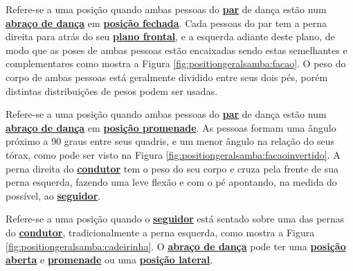 \begin{definition}
\label{def:facao-position} 
Refere-se a uma posição quando ambas pessoas do \hyperref[def:Par]{\textbf{par}} de dança
estão num \hyperref[def:abracodedanca]{\textbf{abraço de dança}}
em \hyperref[def:closed-position]{\textbf{posição fechada}}.
Cada pessoas do par tem a perna direita para atrás do seu \hyperref[def:PlanoFrontal]{\textbf{plano frontal}},
e a esquerda adiante deste plano, de modo que as poses de ambas pessoas estão
encaixadas sendo estas semelhantes e complementares como mostra a Figura \ref{fig:positiongeralsamba:facao}.
O peso do corpo de ambas pessoas está geralmente dividido entre seus dois pés,
porém distintas distribuições de pesos podem ser usadas.
\end{definition}

\begin{definition}
\label{def:facao-invertido-position} 
Refere-se a uma posição quando ambas pessoas do \hyperref[def:Par]{\textbf{par}} 
de dança estão num \hyperref[def:abracodedanca]{\textbf{abraço de dança}}
em \hyperref[def:promenade-position]{\textbf{posição promenade}}.
As pessoas formam uma ângulo próximo a 90 graus entre seus quadris,
e um menor ângulo na relação do seus tórax, como pode ser visto na Figura \ref{fig:positiongeralsamba:facaoinvertido}.
A perna direita do \hyperref[def:Condutor]{\textbf{condutor}} tem o peso do seu corpo e 
cruza pela frente de sua perna esquerda, fazendo uma leve flexão e com o pé apontando,
na medida do possível, ao \hyperref[def:Seguidor]{\textbf{seguidor}}.
\end{definition}

\begin{definition}
\label{def:cadeirinha-position} 
Refere-se a uma posição quando o \hyperref[def:Seguidor]{\textbf{seguidor}} 
está sentado sobre uma das pernas do \hyperref[def:Condutor]{\textbf{condutor}},
tradicionalmente a perna esquerda, como mostra a Figura \ref{fig:positiongeralsamba:cadeirinha}.
O \hyperref[def:abracodedanca]{\textbf{abraço de dança}} pode ter 
uma \hyperref[def:open-position]{\textbf{posição aberta}} e 
\hyperref[def:promenade-position]{\textbf{promenade}}
ou uma  \hyperref[def:lateral-position]{\textbf{posição lateral}}.
\end{definition}

